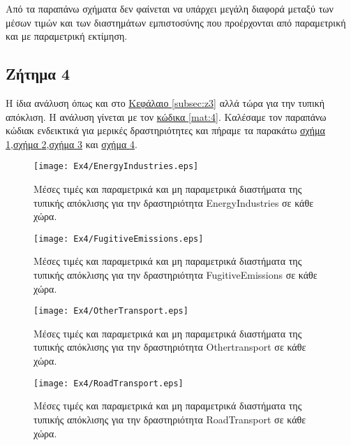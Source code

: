 \documentclass[11pt]{scrartcl} %
\begin{document}
Από τα παραπάνω σχήματα δεν φαίνεται να υπάρχει μεγάλη διαφορά μεταξύ των μέσων τιμών και των διαστημάτων εμπιστοσύνης που προέρχονται από παραμετρική και με παραμετρική εκτίμηση.

\subsection{Ζήτημα 4}
\label{subsec:z4}

Η ίδια ανάλυση όπως και στο \hyperref[subsec:z3]{Κεφάλαιο \ref*{subsec:z3}} αλλά τώρα για την τυπική απόκλιση. Η ανάλυση γίνεται με τον \hyperref[mat:4]{κώδικα \ref*{mat:4}}. Καλέσαμε τον παραπάνω κώδιακ ενδεικτικά για μερικές δραστηριότητες και πήραμε τα παρακάτω \hyperref[fig:z41]{σχήμα \ref*{fig:z41}},\hyperref[fig:z42]{σχήμα \ref*{fig:z42}},\hyperref[fig:z43]{σχήμα \ref*{fig:z43}} και \hyperref[fig:z44]{σχήμα \ref*{fig:z44}}.

\begin{figure}[H]

	\centering
	\texttt{[image: Ex4/EnergyIndustries.eps]}	
\caption{Μέσες τιμές και παραμετρικά και μη παραμετρικά διαστήματα της τυπικής απόκλισης για την δραστηριότητα EnergyIndustries σε κάθε χώρα.}
\label{fig:z41} 
\end{figure}

\begin{figure}[H]

	\centering
	\texttt{[image: Ex4/FugitiveEmissions.eps]}	
\caption{Μέσες τιμές και παραμετρικά και μη παραμετρικά διαστήματα της τυπικής απόκλισης για την δραστηριότητα FugitiveEmissions σε κάθε χώρα.}
\label{fig:z42} 
\end{figure}

\begin{figure}[H]
 
	\centering
	\texttt{[image: Ex4/OtherTransport.eps]}	
\caption{Μέσες τιμές και παραμετρικά και μη παραμετρικά διαστήματα της τυπικής απόκλισης για την δραστηριότητα Othertransport σε κάθε χώρα.}
\label{fig:z43}
\end{figure}

\begin{figure}[H]

	\centering
	\texttt{[image: Ex4/RoadTransport.eps]}	
\caption{Μέσες τιμές και παραμετρικά και μη παραμετρικά διαστήματα της τυπικής απόκλισης για την δραστηριότητα RoadTransport σε κάθε χώρα.}
\label{fig:z44} 
\end{figure}
\end{document}
